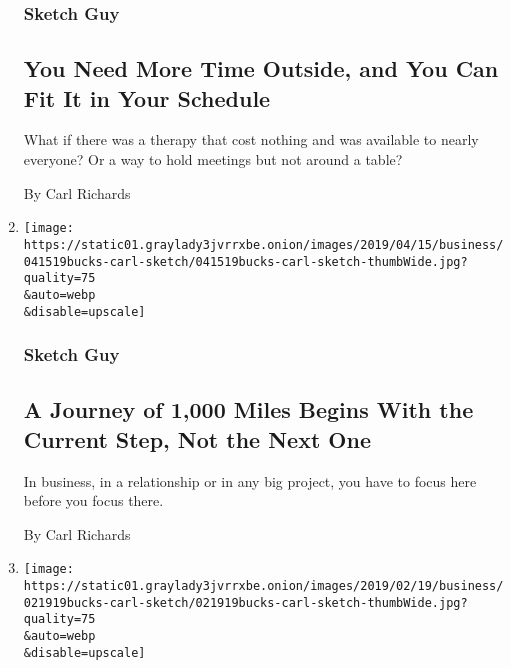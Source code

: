 \begin{enumerate}
  \hypertarget{sketch-guy-6}{%
  \subsubsection{Sketch Guy}\label{sketch-guy-6}}

  \hypertarget{you-need-more-time-outside-and-you-can-fit-it-in-your-schedule}{%
  \subsection{You Need More Time Outside, and You Can Fit It in Your
  Schedule}\label{you-need-more-time-outside-and-you-can-fit-it-in-your-schedule}}

  What if there was a therapy that cost nothing and was available to
  nearly everyone? Or a way to hold meetings but not around a table?

  By Carl Richards
\item
  \href{/2019/04/17/your-money/one-step-at-a-time.html}{}

  \texttt{[image: https://static01.graylady3jvrrxbe.onion/images/2019/04/15/business/041519bucks-carl-sketch/041519bucks-carl-sketch-thumbWide.jpg?quality=75\\\&auto=webp\\\&disable=upscale]}

  \hypertarget{sketch-guy-7}{%
  \subsubsection{Sketch Guy}\label{sketch-guy-7}}

  \hypertarget{a-journey-of-1000-miles-begins-with-the-current-step-not-the-next-one}{%
  \subsection{A Journey of 1,000 Miles Begins With the Current Step, Not
  the Next
  One}\label{a-journey-of-1000-miles-begins-with-the-current-step-not-the-next-one}}

  In business, in a relationship or in any big project, you have to
  focus here before you focus there.

  By Carl Richards
\item
  \href{/2019/02/19/your-money/sketch-guy-knowledge-workers-need-rest.html}{}

  \texttt{[image: https://static01.graylady3jvrrxbe.onion/images/2019/02/19/business/021919bucks-carl-sketch/021919bucks-carl-sketch-thumbWide.jpg?quality=75\\\&auto=webp\\\&disable=upscale]}

  \hypertarget{sketch-guy-8}{%
}
\end{enumerate}
